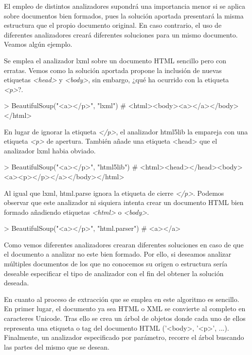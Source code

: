 El empleo de distintos analizadores supondrá una importancia menor si se aplica sobre documentos bien 
formados, pues la solución aportada presentará la misma estructura que el propio documento original. En 
caso contrario, el uso de diferentes analizadores creará diferentes soluciones para un mismo documento. 
Veamos algún ejemplo.

Se emplea el analizador lxml sobre un documento HTML sencillo pero con erratas. Vemos como la solución 
aportada propone la inclusión de nuevas etiquetas \emph{<head>} y \emph{<body>}, sin embargo, ¿qué ha 
ocurrido con la etiqueta \emph{<p>}?.

\begin{Schunk}
  \begin{Soutput}
    > BeautifulSoup("<a></p>", "lxml")
    # <html><body><a></a></body></html>
  \end{Soutput}
\end{Schunk}

En lugar de ignorar la etiqueta \emph{</p>}, el analizador html5lib la empareja con una etiqueta \emph{<p>}
de apertura. También añade una etiqueta <head> que el analizador lxml habia obviado.

\begin{Schunk}
  \begin{Soutput}
    > BeautifulSoup("<a></p>", "html5lib")
    # <html><head></head><body><a><p></p></a></body></html>
  \end{Soutput}
\end{Schunk}

Al igual que lxml, html.parse ignora la etiqueta de cierre \emph{</p>}. Podemos observar que este analizador 
ni siquiera intenta crear un documento HTML bien formado añadiendo etiquetas \emph{<html>} o \emph{<body>}.

\begin{Schunk}
  \begin{Soutput}
    > BeautifulSoup("<a></p>", "html.parser")
    # <a></a>
  \end{Soutput}
\end{Schunk}

Como vemos diferentes analizadores crearan diferentes soluciones en caso de que el documento a analizar
no este bien formado. Por ello, si deseamos analizar múltiples documentos de los que no conocemos su origen
o estructura sería deseable especificar el tipo de analizador con el fin del obtener la solución deseada.

En cuanto al proceso de extracción que se emplea en este algoritmo es sencillo. En primer lugar, el documento ya sea
HTML o XML se convierte al completo en caracteres Unicode. Tras ello se crea un árbol de objetos donde
cada uno de ellos representa una etiqueta o tag del documento HTML ('<body>, '<p>', ...). Finalmente, un 
analizador especificado por parámetro, recorre el árbol buscando las partes del mismo que se desean.


